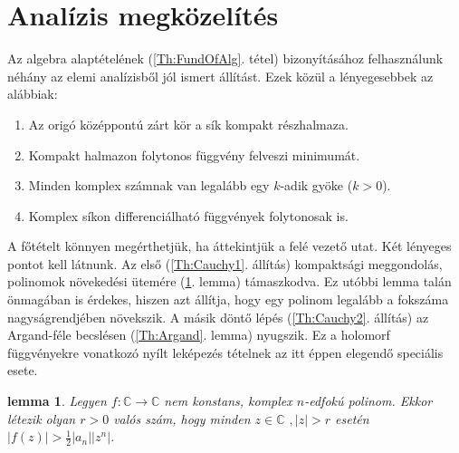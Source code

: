 \documentclass[a4paper, showtrims]{memoir}
\theoremstyle{plain}
\newtheorem{lemma}[proposition]{lemma}
\theoremstyle{remark}
\theoremstyle{definition}
\begin{document}
\section{Analízis megközelítés}
Az algebra alaptételének (\ref{Th:FundOfAlg}. tétel) bizonyításához felhasználunk néhány az elemi analízisből
jól ismert állítást.
Ezek közül a lényegesebbek az alábbiak:
\begin{enumerate}
	\item  Az origó középpontú zárt kör a sík
	      kompakt részhalmaza.

	\item  Kompakt halmazon folytonos függvény felveszi minimumát.

	\item  Minden komplex számnak van legalább egy $k$-adik gyöke ($k>0$).

	\item  Komplex síkon differenciálható függvények
	      folytonosak is.
\end{enumerate}

A főtételt könnyen megérthetjük, ha áttekintjük
a felé vezető utat.
Két lényeges pontot kell látnunk.
Az első (\ref{Th:Cauchy1}. állítás) kompaktsági meggondolás, polinomok növekedési ütemére (\ref{Th:Grow}. lemma) támaszkodva.
Ez utóbbi lemma talán önmagában is érdekes, hiszen azt állítja, hogy egy polinom legalább a fokszáma nagyságrendjében növekszik.
A másik döntő lépés (\ref{Th:Cauchy2}. állítás) az Argand-féle becslésen (\ref{Th:Argand}. lemma) nyugszik.
Ez a holomorf függvényekre vonatkozó nyílt leképezés tételnek az itt éppen elegendő speciális esete.

\begin{lemma}
	\label{Th:Grow}Legyen $f:\mathbb{C}\rightarrow \mathbb{C}$ nem konstans,
	komplex $n$-edfokú polinom.
	Ekkor létezik olyan $r>0$ valós szám, hogy minden $z\in \mathbb{C}$ $,\left| z\right| >r$ esetén $\left| f\left( z\right) \right| >\frac{1}{2}\left| a_{n}\right| \left|
		z^{n}\right| $.
\end{lemma}
\end{document}
